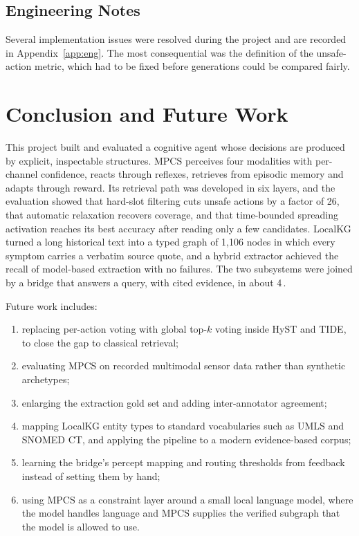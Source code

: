 \documentclass[12pt,a4paper,oneside]{report}
\newcommand{\ms}{\,\text{ms}}
\begin{document}
\section{Engineering Notes}
Several implementation issues were resolved during the project and are recorded in Appendix~\ref{app:eng}. The most consequential was the definition of the unsafe-action metric, which had to be fixed before generations could be compared fairly.

\chapter{Conclusion and Future Work}\label{ch:conclusion}
This project built and evaluated a cognitive agent whose decisions are produced by explicit, inspectable structures. MPCS perceives four modalities with per-channel confidence, reacts through reflexes, retrieves from episodic memory and adapts through reward. Its retrieval path was developed in six layers, and the evaluation showed that hard-slot filtering cuts unsafe actions by a factor of 26, that automatic relaxation recovers coverage, and that time-bounded spreading activation reaches its best accuracy after reading only a few candidates. LocalKG turned a long historical text into a typed graph of 1,106 nodes in which every symptom carries a verbatim source quote, and a hybrid extractor achieved the recall of model-based extraction with no failures. The two subsystems were joined by a bridge that answers a query, with cited evidence, in about 4\ms{}.

Future work includes:
\begin{enumerate}
  \item replacing per-action voting with global top-$k$ voting inside HyST and TIDE, to close the gap to classical retrieval;
  \item evaluating MPCS on recorded multimodal sensor data rather than synthetic archetypes;
  \item enlarging the extraction gold set and adding inter-annotator agreement;
  \item mapping LocalKG entity types to standard vocabularies such as UMLS and SNOMED CT, and applying the pipeline to a modern evidence-based corpus;
  \item learning the bridge's percept mapping and routing thresholds from feedback instead of setting them by hand;
  \item using MPCS as a constraint layer around a small local language model, where the model handles language and MPCS supplies the verified subgraph that the model is allowed to use.
\end{enumerate}
\end{document}
